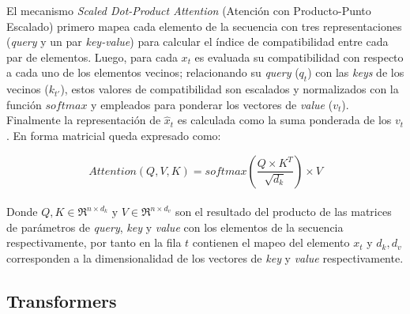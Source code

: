 		El mecanismo \textit{Scaled Dot-Product Attention} (Atención con Producto-Punto Escalado) primero mapea cada elemento de la secuencia con tres representaciones (\textit{query} y un par \textit{key-value}) para calcular el índice de compatibilidad entre cada par de elementos. Luego, para cada $x_t$ es evaluada su compatibilidad con respecto a cada uno de los  elementos vecinos; relacionando su \textit{query} ($q_t$) con las \textit{keys} de los vecinos ($k_{t'}$), estos valores de compatibilidad son escalados y normalizados con la función $softmax$ y empleados para ponderar los vectores de \textit{value} ($v_t$). Finalmente la representación de $\hat{x}_t$ es calculada como la suma ponderada de los $v_t$. En forma matricial queda expresado como:
		
		\begin{equation}
			Attention(Q, V, K) = softmax(\frac{Q\times K^T}{\sqrt{d_k}})\times V
			\label{dotP-att}
		\end{equation} \\
		Donde $Q, K \in \Re^{n\times d_k} \text{ y } V \in \Re^{n\times d_v} $ son el resultado del producto de las matrices de parámetros de \textit{query}, \textit{key} y \textit{value} con los elementos de la secuencia respectivamente, por tanto en la fila $t$ contienen el mapeo del elemento $x_t$ y  $d_k,d_v$ corresponden a la dimensionalidad de los vectores de \textit{key} y \textit{value} respectivamente.
		
\subsection{Transformers}

